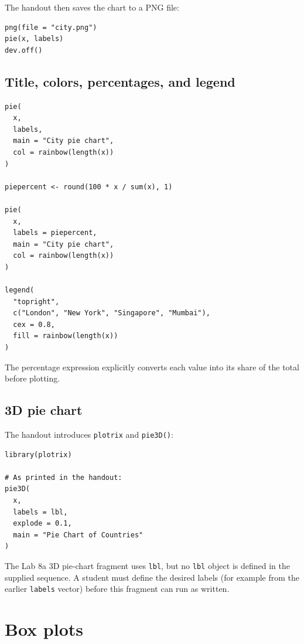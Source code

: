 The handout then saves the chart to a PNG file:

\begin{lstlisting}[style=dsr]
png(file = "city.png")
pie(x, labels)
dev.off()
\end{lstlisting}

\subsection{Title, colors, percentages, and legend}

\begin{lstlisting}[style=dsr]
pie(
  x,
  labels,
  main = "City pie chart",
  col = rainbow(length(x))
)

piepercent <- round(100 * x / sum(x), 1)

pie(
  x,
  labels = piepercent,
  main = "City pie chart",
  col = rainbow(length(x))
)

legend(
  "topright",
  c("London", "New York", "Singapore", "Mumbai"),
  cex = 0.8,
  fill = rainbow(length(x))
)
\end{lstlisting}

The percentage expression explicitly converts each value into its share of the total before plotting.

\subsection{3D pie chart}

The handout introduces \texttt{plotrix} and \texttt{pie3D()}:

\begin{lstlisting}[style=dsr]
library(plotrix)

# As printed in the handout:
pie3D(
  x,
  labels = lbl,
  explode = 0.1,
  main = "Pie Chart of Countries"
)
\end{lstlisting}

\begin{pitfall}
The Lab 8a 3D pie-chart fragment uses \texttt{lbl}, but no \texttt{lbl} object is defined in the supplied sequence. A student must define the desired labels (for example from the earlier \texttt{labels} vector) before this fragment can run as written.
\end{pitfall}

\section{Box plots}

